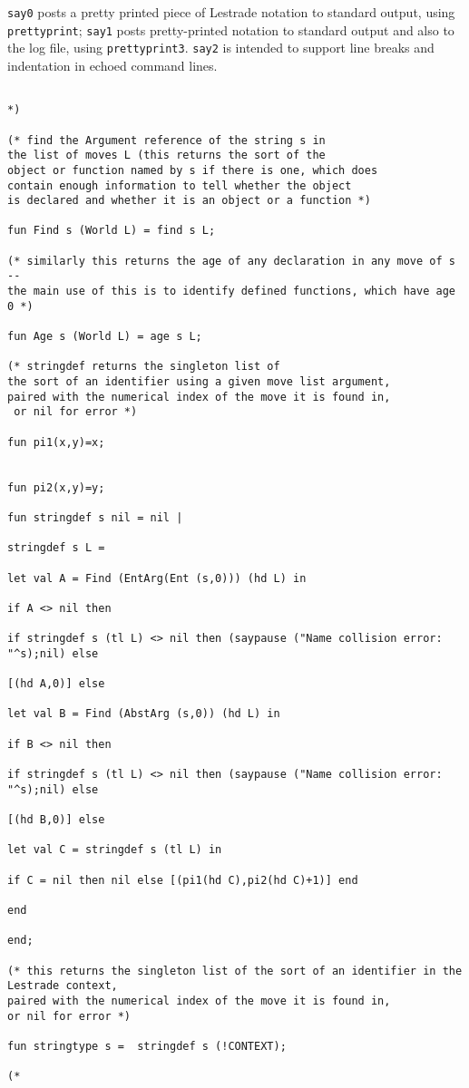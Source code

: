 \documentclass{article}
\begin{document}
{\tt say0} posts a pretty printed piece of Lestrade notation to standard output, using {\tt prettyprint};  {\tt say1} posts pretty-printed notation
to standard output and also to the log file, using {\tt prettyprint3}.  {\tt say2} is intended to support line breaks and  indentation in echoed command lines.

\begin{verbatim}

*)

(* find the Argument reference of the string s in
the list of moves L (this returns the sort of the 
object or function named by s if there is one, which does
contain enough information to tell whether the object
is declared and whether it is an object or a function *)

fun Find s (World L) = find s L;

(* similarly this returns the age of any declaration in any move of s -- 
the main use of this is to identify defined functions, which have age 0 *)

fun Age s (World L) = age s L;

(* stringdef returns the singleton list of 
the sort of an identifier using a given move list argument,
paired with the numerical index of the move it is found in,
 or nil for error *)

fun pi1(x,y)=x;


fun pi2(x,y)=y;

fun stringdef s nil = nil |

stringdef s L =

let val A = Find (EntArg(Ent (s,0))) (hd L) in

if A <> nil then  

if stringdef s (tl L) <> nil then (saypause ("Name collision error: "^s);nil) else

[(hd A,0)] else

let val B = Find (AbstArg (s,0)) (hd L) in

if B <> nil then 

if stringdef s (tl L) <> nil then (saypause ("Name collision error: "^s);nil) else

[(hd B,0)] else

let val C = stringdef s (tl L) in

if C = nil then nil else [(pi1(hd C),pi2(hd C)+1)] end

end

end;

(* this returns the singleton list of the sort of an identifier in the Lestrade context,
paired with the numerical index of the move it is found in,
or nil for error *)

fun stringtype s =  stringdef s (!CONTEXT);

(*

\end{verbatim}
\end{document}
